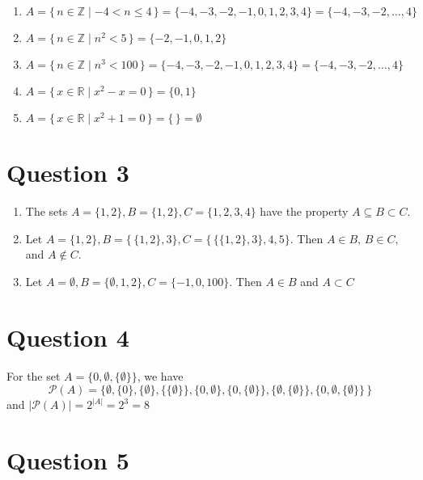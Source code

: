 \documentclass[11pt, oneside]{article}   	%
\begin{document}
\begin{enumerate}[ (a)]           
    \item $A = \{\,n \in \mathbb{Z} \mid -4 < n \leq 4 \,\} = \{-4, -3, -2, -1, 0, 1, 2, 3, 4 \} = \{-4, -3, -2, \ldots , 4\}$
    \item $A = \{\,n \in \mathbb{Z} \mid n^2 < 5 \,\} = \{-2, -1, 0, 1, 2\}$
    \item $A = \{\,n \in \mathbb{Z} \mid n^3 < 100 \,\} = \{-4, -3, -2, -1, 0, 1, 2, 3, 4 \} = \{-4, -3, -2, \ldots , 4 \}$
    \item $A = \{\,x \in \mathbb{R} \mid x^2-x = 0 \,\} = \{0, 1\}$
    \item $A = \{\,x \in \mathbb{R} \mid x^2 + 1 = 0 \,\} = \{ \, \} = \emptyset$
        
\end{enumerate}

\section*{Question 3}

\begin{enumerate}[ (a)]           
    \item The sets $A = \{1, 2\}, B = \{1, 2\}, C = \{1, 2, 3, 4\}$ have the property $A \subseteq B \subset C$.
    \item Let $A = \{1, 2\}, B = \{ \, \{1, 2\}, 3 \}, C = \{ \, \{\{1, 2\}, 3 \}, 4, 5\}$.
    Then $A \in B, \, B \in C,$ and $A \notin C$.
    \item Let $A = \emptyset, B = \{\emptyset, 1, 2\}, C = \{-1, 0, 100\}$. Then $A \in B$ and $A \subset C$
        
\end{enumerate}

\section*{Question 4}

For the set $A = \{0, \emptyset, \{\emptyset \}\}$, we have $$\mathcal{P}(A) = \{\emptyset, \{0\}, \{\emptyset\}, \{\{\emptyset \}\}, \{0, \emptyset\}, \{0, \{\emptyset \}\}, \{\emptyset, \{\emptyset\}\}, \{0, \emptyset, \{\emptyset \}\} \,  \}$$ and $|\mathcal{P}(A)| = 2^{|A|} = 2^3 = 8$

\section*{Question 5}
\end{document}
